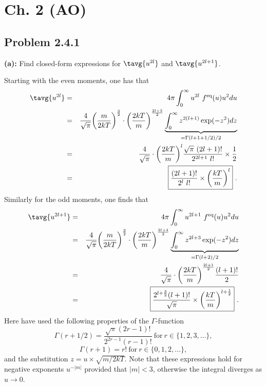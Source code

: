 \section{Ch. 2 (AO)}
\subsection{Problem 2.4.1}

\textbf{(a):} Find closed-form expressions for $\tavg{u^{2 l}}$ and $\tavg{u^{2 l+1}}$.

Starting with the even moments, one has that
\begin{eqnarray}
\tavg{u^{2 l} } &=& 4 \pi \int^{\infty}_{0} u^{2 l} ~f^{\text{eq}}(u) u^2 du \nonumber \\
&=& \frac{4}{\sqrt{\pi}} \bigg(\frac{m}{2 k T}\bigg)^{\frac{3}{2}} \cdot \bigg(\frac{2 k T}{m}\bigg)^{\frac{2l+3}{2}} \underbrace{\int^{\infty}_{0} z^{2(l+1)} \exp(-z^2) dz}_{=\Gamma(l+1+1/2)/2} \nonumber \\
&=& \frac{4}{\sqrt{\pi}} \cdot \bigg(\frac{2 k T}{m}\bigg)^l \frac{\sqrt{\pi} ~(2l+1)!}{2^{2l+1} ~ l!} \times \frac{1}{2} \nonumber \\
&=& \boxed{\frac{(2l+1)!}{2^{l} ~ l!} \times \bigg(\frac{k T}{m}\bigg)^l}~.
\end{eqnarray}
Similarly for the odd moments, one finds that
\begin{eqnarray}
\tavg{u^{2 l+1} } &=& 4 \pi \int^{\infty}_{0} u^{2 l+1} ~f^{\text{eq}}(u) u^2 du \nonumber \\
&=& \frac{4}{\sqrt{\pi}} \bigg(\frac{m}{2 k T}\bigg)^{\frac{3}{2}} \cdot \bigg(\frac{2 k T}{m}\bigg)^{\frac{2l+4}{2}} \underbrace{\int^{\infty}_{0} z^{2l+3} \exp(-z^2) dz}_{=\Gamma(l+2)/2} \nonumber \\
&=& \frac{4}{\sqrt{\pi}} \cdot \bigg(\frac{2 k T}{m}\bigg)^{\frac{2l+1}{2}} \frac{(l+1)!}{2} \nonumber \\
&=&  \boxed{\frac{2^{l+\frac{3}{2}} (l+1)!}{\sqrt{\pi}} \times \bigg(\frac{k T}{m}\bigg)^{l+\frac{1}{2}}}~. 
\end{eqnarray}
Here have used the following properties of the $\Gamma$-function
\begin{equation}
\Gamma(r+1/2) = \frac{\sqrt{\pi} (2r-1)!}{2^{2r-1} (r-1)!}~\text{for}~r\in\{1, 2, 3, \dots\},
\end{equation}
\begin{equation}
\Gamma(r+1) = r!~\text{for}~r\in\{0, 1, 2, \dots\},
\end{equation}
and the substitution $z = u \times \sqrt{m/2 k T}$.
Note that these expressions hold for negative exponents $u^{-|m|}$ provided that $|m|<3$, otherwise the integral diverges as $u\rightarrow0$.

